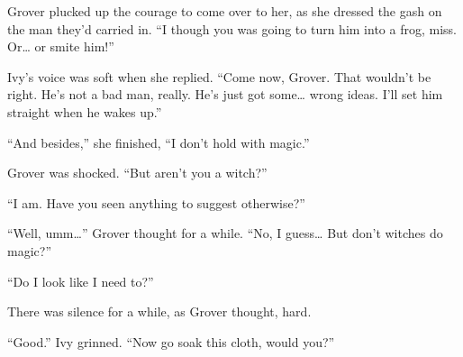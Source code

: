 \storybreak

Grover plucked up the courage to come over to her, as she dressed the gash on the man they'd carried in.
``I though you was going to turn him into a frog, miss.
Or{\dots} or smite him!''

Ivy's voice was soft when she replied.
``Come now, Grover.
That wouldn't be right.
He's not a bad man, really.
He's just got some{\dots} wrong ideas.
I'll set him straight when he wakes up.''

``And besides,'' she finished, ``I don't hold with magic.''

Grover was shocked.
``But aren't you a witch?''

``I am.
Have you seen anything to suggest otherwise?''

``Well, umm{\dots}''
Grover thought for a while.
``No, I guess{\dots}
But don't witches do magic?''

``Do I look like I need to?''

There was silence for a while, as Grover thought, hard.

``Good.''
Ivy grinned.
``Now go soak this cloth, would you?''
